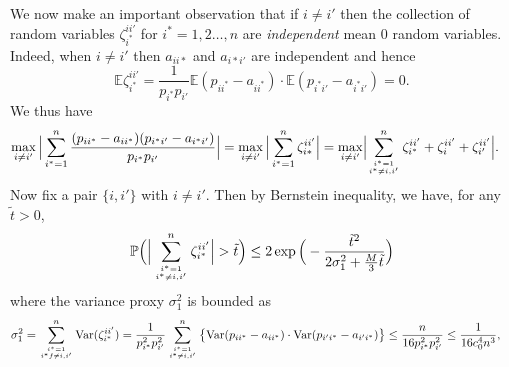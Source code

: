\documentclass[10pt,journal,compsoc]{IEEEtran}
\newcommand*{\p}{\mathbb{P}}
\newcommand{\ee}{\end{aligned} \end{equation}}
\newcommand{\E}{\mathbb{E}}
\newcommand{\BL}{\Big (}
\newcommand{\BR}{\Big )}
\newcommand{\bee}{\begin{equation}\begin{aligned}}
\numberwithin{equation}{section}
\begin{document}
We now make an important observation that if $i \not = i'$ then the collection of random variables
$\zeta_{i^*}^{ii'}$ for $i^{*} = 1,2\dots,n$ are {\em independent} mean
$0$ random variables. Indeed, when $i \not = i'$ then $a_{ii*}$ and
$a_{i*i'}$ are independent and hence
\begin{equation*}
\E\zeta^{ii'}_{i^{*}} = \frac{1}{p_{i^*} p_{i'}}\E(p_{ii^*} -
a_{ii^*})
\cdot \E(p_{i^{*}i'} - a_{i^*i'}) = 0.
\end{equation*}
We thus have
\bee\label{T1:off-d}
\max_{i \neq {i'}}\Big|\sum_{i^{*}= 1}^{n}\frac{(p_{ii^*} - a_{ii^*})(p_{i^*i'} - a_{i^{*}{i'}})}{p_{i^*}p_{i'}} \Big|
&= \max_{i \neq
  {i'}}\Big|\sum_{i^{*}= 1}^{n} \zeta_{i*}^{ii'} \Big|
 = \max_{i \not
  = i'} \Bigl|
\sum_{i^* = 1\atop i^* \neq i,{i'}}^{n}\zeta^{ii'}_{i^{*}}
+ \zeta^{ii'}_i + \zeta^{ii'}_{i'} \Bigr|.
\ee
Now fix a pair $\{i,i'\}$ with $i \not = i'$. 
Then by Bernstein inequality, we have, for any $\tilde{t} > 0$,
\bee\label{T1:bern}
\p\Big(\Big|\sum_{i^{*} = 1\atop i^{*} \neq
  i,{i'}}^{n}\zeta^{ii'}_{i^{*}}\Big|>\tilde{t} \Big)\leq 2 \exp\Big(-\frac{\tilde{t}^2}{2\sigma^2_1+\frac{M}{3}\tilde{t}}\Big)
\ee
where the variance proxy $\sigma_1^2$ is bounded as
\begin{equation*}
  \begin{split}
\sigma_1^2 &= \sum_{i^* = 1\atop i^*f\neq i,{i'}}^{n} \text{Var}(\zeta^{ii'}_{i^{*}})  
= \frac{1}{p_{i^*}^2p_{i'}^2}\sum_{i^* = 1\atop i^*\neq i,{i'}}^{n}\big\{ \text{Var}({p_{ii^*}} - {a_{ii^*}}) \cdot \text{Var}({p_{{i'}i^{*}}} - {a_{i'i^*}})\big\} 
\leq \frac{n}{16p_{i^*}^2p_{i'}^2}
\leq\frac{1}{16c_0^4n^3},
\end{split}
\end{equation*}
\end{document}
